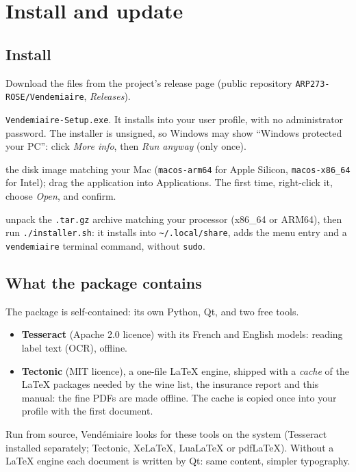 \documentclass[11pt,a4paper]{article}
\begin{document}
\section{Install and update}

\subsection{Install}
Download the files from the project's release page (public repository
\texttt{ARP273-ROSE/\allowbreak Vendemiaire}, \emph{Releases}).
\begin{description}[style=nextline,leftmargin=1.2em]
  \item[Windows] \texttt{Vendemiaire-Setup.exe}. It installs into your user profile, with no administrator
    password. The installer is unsigned, so Windows may show ``Windows protected your PC'': click \emph{More
    info}, then \emph{Run anyway} (only once).
  \item[macOS] the disk image matching your Mac (\texttt{macos-arm64} for Apple Silicon,
    \texttt{macos-x86\_64} for Intel); drag the application into Applications. The first time, right-click it,
    choose \emph{Open}, and confirm.
  \item[Linux] unpack the \texttt{.tar.gz} archive matching your processor (x86\_64 or ARM64), then run
    \texttt{./installer.sh}: it installs into \texttt{\textasciitilde/.local/share}, adds the menu entry and a
    \texttt{vendemiaire} terminal command, without \texttt{sudo}.
\end{description}

\subsection{What the package contains}
The package is self-contained: its own Python, Qt, and two free tools.
\begin{itemize}
  \item \textbf{Tesseract} (Apache 2.0 licence) with its French and English models: reading label text (OCR),
        offline.
  \item \textbf{Tectonic} (MIT licence), a one-file LaTeX engine, shipped with a \emph{cache} of the LaTeX
        packages needed by the wine list, the insurance report and this manual: the fine PDFs are made
        offline. The cache is copied once into your profile with the first document.
\end{itemize}
Run from source, Vendémiaire looks for these tools on the system (Tesseract installed separately; Tectonic,
XeLaTeX, LuaLaTeX or pdfLaTeX). Without a LaTeX engine each document is written by Qt: same content, simpler
typography.
\end{document}
